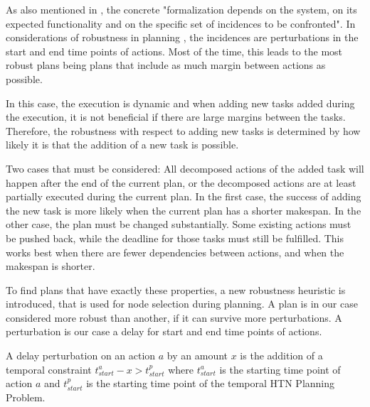 As also mentioned in \cite{barberRobustnessStabilityRecoverability2015}, the concrete "formalization depends on the system, on its expected functionality and on the specific set of incidences to be confronted".
In considerations of robustness in planning \citep{lundRobustExecutionProbabilistic2017}, the incidences are perturbations in the start and end time points of actions.
Most of the time, this leads to the most robust plans being plans that include as much margin between actions as possible.

In this case, the execution is dynamic and when adding new tasks added during the execution, it is not beneficial if there are large margins between the tasks.
Therefore, the robustness with respect to adding new tasks is determined by how likely it is that the addition of a new task is possible.

Two cases that must be considered: All decomposed actions of the added task will happen after the end of the current plan, or the decomposed actions are at least partially executed during the current plan.
In the first case, the success of adding the new task is more likely when the current plan has a shorter makespan.
In the other case, the plan must be changed substantially.
Some existing actions must be pushed back, while the deadline for those tasks must still be fulfilled.
This works best when there are fewer dependencies between actions, and when the makespan is shorter.

To find plans that have exactly these properties, a new robustness heuristic is introduced, that is used for node selection during planning.
A plan is in our case considered more robust than another, if it can survive more perturbations.
A perturbation is our case a delay for start and end time points of actions.

\begin{definition}
    A delay perturbation on an action $a$ by an amount $x$ is the addition of a temporal constraint $t^a_{start} - x > t^p_{start}$ where $t^a_{start}$ is the starting time point of action $a$ and $t^p_{start}$ is the starting time point of the temporal HTN Planning Problem.
\end{definition}


